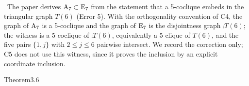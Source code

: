 \begin{remark}
 \repair\ The paper derives $\mathrm{A}_7\subset\mathrm{E}_7$ from the statement that a 5-coclique
 embeds in the triangular graph $T(6)$ (Error 5). With the orthogonality convention of C4,
 the graph of $\mathrm{A}_7$ is a 5-coclique and the graph of $\mathrm{E}_7$ is the disjointness
 graph $\comp{T(6)}$; the witness is a 5-coclique of $\comp{T(6)}$, equivalently a 5-clique
 of $T(6)$, and the five pairs $\{1,j\}$ with $2\leq j\leq6$ pairwise intersect. We record
 the correction only; C5 does not use this witness, since it proves the inclusion by an
 explicit coordinate inclusion.
\end{remark}

\begin{cgss}{Theorem}{3.6}\label{thm:3.6}
\end{cgss}
